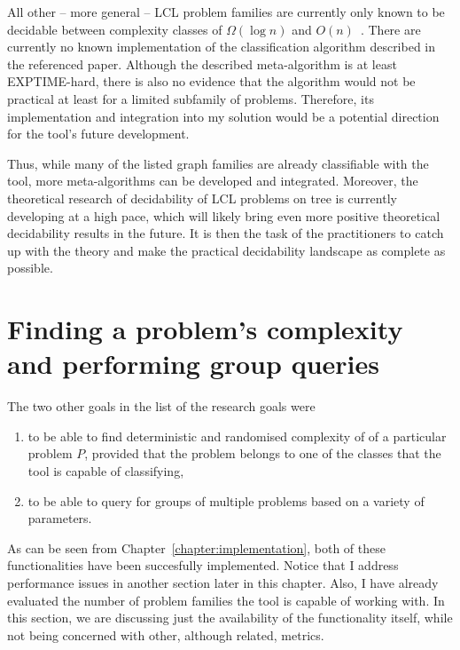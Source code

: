 All other -- more general -- LCL problem families
are currently only known to be decidable between complexity classes of
$\Omega(\log n)$ and $O(n)$~\cite{Chang2020a}. There are currently
no known implementation of the classification algorithm described in the
referenced paper. Although the described meta-algorithm is at least
EXPTIME-hard, there is also no evidence that the algorithm would not be
practical at least for a limited subfamily of problems. Therefore, its
implementation and integration into my solution would be a potential
direction for the tool's future development.

Thus, while many of the listed graph families are already classifiable
with the tool, more meta-algorithms can be developed
and integrated. Moreover, the theoretical
research of decidability of LCL problems on tree is currently
developing at a high pace, which will likely bring even more
positive theoretical decidability results in the future.
It is then the task of the practitioners to catch up with
the theory and make the practical decidability landscape
as complete as possible.

\section{Finding a problem's complexity and performing group queries}

The two other goals in the list of the research goals were

\begin{enumerate}
  \item to be able to find deterministic and randomised complexity of
  of a particular problem $P$, provided that the problem belongs to
  one of the classes that the tool is capable of classifying,
  \item to be able to query for groups of multiple problems based
  on a variety of parameters.
\end{enumerate}

As can be seen from Chapter~\ref{chapter:implementation},
both of these functionalities have been succesfully implemented.
Notice that
I address performance issues in another section later in
this chapter. Also,
I have already evaluated the number of
problem families the tool is capable of working with. In this section,
we are discussing just the availability of the functionality itself, while not
being concerned with other, although related, metrics.


